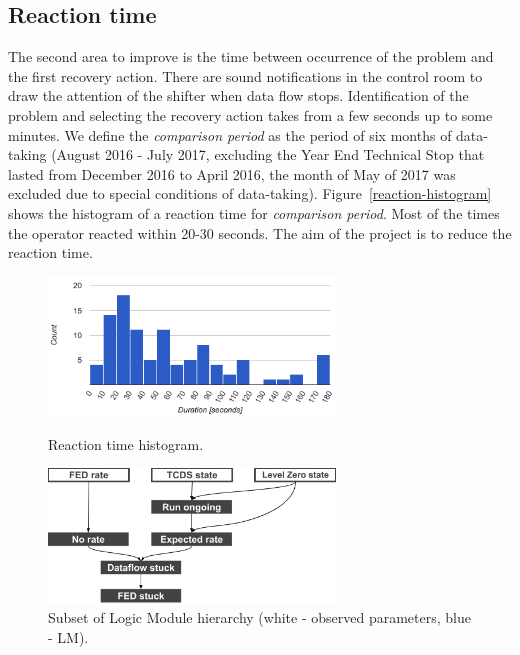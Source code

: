 \documentclass[a4paper]{jpconf}
\begin{document}
\subsection{Reaction time} \label{reaction-section}
The second area to improve is the time between occurrence of the problem and the first recovery action. There are sound notifications in the control room to draw the attention of the shifter when data flow stops. Identification of the problem and selecting the recovery action takes from a few seconds up to some minutes. We define the {\it comparison period} as the period of six months of data-taking (August 2016 - July 2017, excluding the Year End Technical Stop that lasted from December 2016 to April 2016, the month of May of 2017 was excluded due to special conditions of data-taking). Figure~\ref{reaction-histogram} shows the histogram of a reaction time for {\it comparison period}. Most of the times the operator reacted within 20-30 seconds. The aim of the project is to reduce the reaction time.

\begin{figure}[h]
\begin{minipage}{18pc}
\includegraphics[width=18pc]{reaction-histogram-2016.png}
\caption{\label{reaction-histogram}Reaction time histogram.}
\end{minipage}\hspace{2pc}%
\begin{minipage}{18pc}
\includegraphics[width=18pc]{logic-module-hierarchy.png}
\caption{\label{subsetoflm}Subset of Logic Module hierarchy (white - observed parameters, blue - LM). }
\end{minipage} 
\end{figure}
\end{document}
